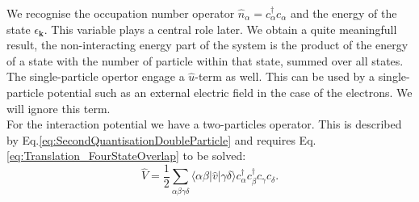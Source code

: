 \documentclass[../main.tex]{subfile}
\begin{document}
We recognise the occupation number operator $\hat{n}_{\alpha} = c_{\alpha}^{\dagger} c_{\alpha}$ and the energy of the state $\epsilon_{\bm{k}}$. This variable plays a central role later.
We obtain a quite meaningfull result, the non-interacting energy part of the system is the product of the energy of a 
state with the number of particle within that state, summed over all states.
The single-particle opertor engage a $\hat{u}$-term as well. This can be used by a single-particle potential such as an external electric field 
in the case of the electrons. We will ignore this term.\\

For the interaction potential we have a two-particles operator. This is described by Eq.\ref{eq:SecondQuantisationDoubleParticle} and
requires Eq.\ref{eq:Translation_FourStateOverlap} to be solved:
\[
    \hat{V} = \frac{1}{2} \sum_{\alpha \beta \gamma \delta} \langle \alpha \beta |\hat{v}|\gamma\delta\rangle 
    c_{\alpha}^{\dagger}c_{\beta}^{\dagger}c_{\gamma}c_{\delta}.
\]
\end{document}
